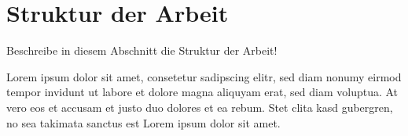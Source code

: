 \section{Struktur der Arbeit}
\label{sec:einleitung:struktur}
Beschreibe in diesem Abschnitt die Struktur der Arbeit!

Lorem ipsum dolor sit amet, consetetur sadipscing elitr, sed diam nonumy eirmod tempor invidunt ut labore et dolore magna aliquyam erat, sed diam voluptua. At vero eos et accusam et justo duo dolores et ea rebum. Stet clita kasd gubergren, no sea takimata sanctus est Lorem ipsum dolor sit amet. 
